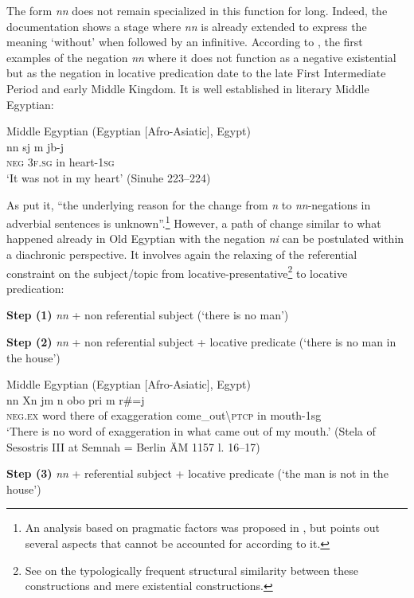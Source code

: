 \documentclass[output=paper]{langsci/langscibook}
\begin{document}
The form \textit{nn} does not remain specialized in this function for long. Indeed, the documentation shows a stage where \textit{nn} is already extended to express the meaning ‘without’ when followed by an infinitive. According to \citet[256–257]{Loprieno-etal2017}, the first examples of the negation \textit{nn} where it does not function as a negative existential but as the negation in locative predication date to the late First Intermediate Period and early Middle Kingdom. It is well established in literary Middle Egyptian: 

\ea Middle Egyptian (Egyptian [Afro-Asiatic], Egypt) \label{ex:AE30}\\
    \gll nn sj m jb-j\\ 
    \textsc{neg} \textsc{3f.sg} in heart-\textsc{1sg}\\ 
    \glt ‘It was not in my heart’ (Sinuhe 223–224) 
\z 

As \citet{Loprieno-etal2017} put it, ``the underlying reason for the change from \textit{n} to \textit{nn}-negations in adverbial sentences is unknown''.\footnote{An analysis based on pragmatic factors was proposed in \citet{Loprieno1991}, but \citet{Uljas2013} points out several aspects that cannot be accounted for according to it.} However, a path of change 
similar to what happened already in Old Egyptian with the negation \textit{ni} can be postulated within a diachronic perspective. It involves again the relaxing of the referential constraint on the subject/topic from locative-presentative\footnote{See \citet[108]{Veselinova2013} on the typologically frequent structural similarity between these constructions and mere existential constructions.} to locative predication:  


\textbf{Step (1)} \textit{nn} + non referential subject (‘there is no man’) 
 
\textbf{Step (2)} \textit{nn} + non referential subject + locative predicate (‘there is no man in the house’) 


\ea Middle Egyptian (Egyptian [Afro-Asiatic], Egypt) \label{ex:AE31}\\
    \gll nn Xn jm n obo pri m r\#=j\\ 
    \textsc{neg.ex} word there of exaggeration come\_out\textbackslash\textsc{ptcp} in mouth-1sg\\
    \glt ‘There is no word of exaggeration in what came out of my mouth.’ (Stela of Sesostris III at Semnah = Berlin ÄM 1157 l. 16–17)
\z {}

\textbf{Step (3)} \textit{nn} + referential subject + locative predicate (‘the man is not in the house’) 
 
\end{document}
